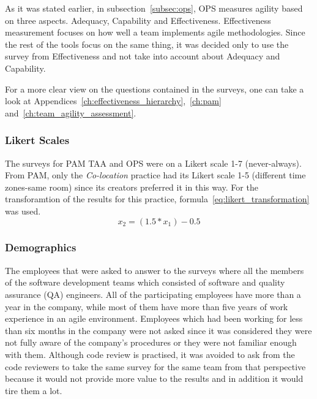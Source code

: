 
As it was stated earlier, in subsection~\ref{subsec:ops}, OPS measures agility based on three aspects. Adequacy, Capability and Effectiveness. Effectiveness measurement focuses on how well a team implements agile methodologies. Since the rest of the tools focus on the same thing, it was decided only to use the survey from Effectiveness and not take into account about Adequacy and Capability.

For a more clear view on the questions contained in the surveys, one can take a look at Appendices~\ref{ch:effectiveness_hierarchy},~\ref{ch:pam} and~\ref{ch:team_agility_assessment}.

\subsubsection{Likert Scales}
The surveys for PAM TAA and OPS were on a Likert scale 1-7 (never-always). From PAM,  only the \textit{Co-location} practice had its Likert scale 1-5 (different time zones-same room) since its creators preferred it in this way. For the transforamtion of the results for this practice, formula~\eqref{eq:likert_transformation} \cite{likert_transformation} was used.  \begin{equation} \label{eq:likert_transformation} x_2 = (1.5 * x_1) - 0.5 \end{equation} 

\subsubsection{Demographics} %
The employees that were asked to answer to the surveys where all the members of the software development teams which consisted of software and quality assurance (QA) engineers. All of the participating employees have more than a year in the company, while most of them have more than five years of work experience in an agile environment. Employees which had been working for less than six months in the company were not asked since it was considered they were not fully aware of the company's procedures or they were not familiar enough with them. Although code review is practised, it was avoided to ask from the code reviewers to take the same survey for the same team from that perspective because it would not provide more value to the results and in addition it would tire them a lot.

